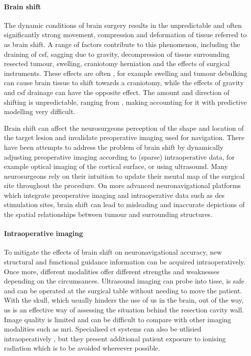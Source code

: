 \paragraph*{Brain shift}

The dynamic conditions of brain surgery results in the unpredictable and often significantly strong movement, compression and deformation of tissue referred to as brain shift.
A range of factors contribute to this phenomenon, including the draining of \gls{csf}, sagging due to gravity, decompression of tissue surrounding resected tumour, swelling, craniotomy herniation  and the effects of surgical instruments.
These effects are often , for example swelling and tumour debulking can cause brain tissue to shift towards a craniotomy, while the effects of gravity and \gls{csf} drainage can have the opposite effect.
The amount and direction of shifting is unpredictable, ranging from , making accounting for it with predictive modelling very difficult.

Brain shift can affect the neurosurgeons perception of the shape and location of the target lesion  and invalidate preoperative imaging used for navigation.
There have been attempts to address the problem of brain shift by dynamically adjusting preoperative imaging according to (sparse) intraoperative data, for example optical imaging of the cortical surface, or using ultrasound. 
Many neurosurgeons rely on their intuition to update their mental map of the surgical site throughout the procedure.
On more advanced neuronavigational platforms which integrate preoperative imaging and intraoperative data such as \gls{des} stimulation sites, brain shift can lead to misleading and inaccurate depictions of the spatial relationships between tumour and surrounding structures.

\paragraph*{Intraoperative imaging}

To mitigate the effects of brain shift on neuronavigational accuracy, new structural and functional guidance information can be acquired intraoperatively.
Once more, different modalities offer different strengths and weaknesses depending on the circumsances.
Ultrasound imaging can probe into tisse, is safe  and can be operated at the surgical table without needing to move the patient.
With the skull, which usually hinders the use of \gls{us} in the brain, out of the way, \gls{us} is an effective way of assessing the situation behind the resection cavity wall.
Image quality is limited and can be difficult to compare with other imaging modalities such as \gls{mri}.
Specialised \gls{ct} systems can also be utlisied intraoperatively \note{[examples]}, but they present additional patient exposure to ionising radiation which is to be avoided whereever possible.

